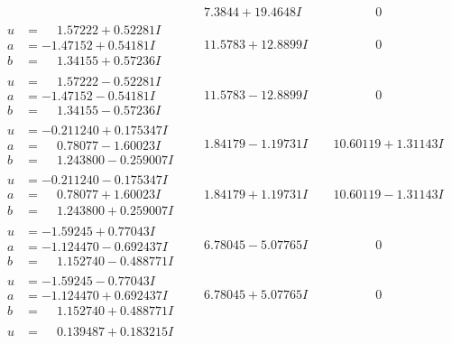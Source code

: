 \documentclass[1p]{elsarticle_modified}
\theoremstyle{definition}
\begin{document}
$$\begin{array}{c|c|c}
 & \phantom{-}7.3844 + 19.4648 I & \phantom{-0.000000 } 0 \\ \hline\begin{aligned}
u &= \phantom{-}1.57222 + 0.52281 I \\
a &= -1.47152 + 0.54181 I \\
b &= \phantom{-}1.34155 + 0.57236 I\end{aligned}
 & \phantom{-}11.5783 + 12.8899 I & \phantom{-0.000000 } 0 \\ \hline\begin{aligned}
u &= \phantom{-}1.57222 - 0.52281 I \\
a &= -1.47152 - 0.54181 I \\
b &= \phantom{-}1.34155 - 0.57236 I\end{aligned}
 & \phantom{-}11.5783 - 12.8899 I & \phantom{-0.000000 } 0 \\ \hline\begin{aligned}
u &= -0.211240 + 0.175347 I \\
a &= \phantom{-}0.78077 - 1.60023 I \\
b &= \phantom{-}1.243800 - 0.259007 I\end{aligned}
 & \phantom{-}1.84179 - 1.19731 I & \phantom{-}10.60119 + 1.31143 I \\ \hline\begin{aligned}
u &= -0.211240 - 0.175347 I \\
a &= \phantom{-}0.78077 + 1.60023 I \\
b &= \phantom{-}1.243800 + 0.259007 I\end{aligned}
 & \phantom{-}1.84179 + 1.19731 I & \phantom{-}10.60119 - 1.31143 I \\ \hline\begin{aligned}
u &= -1.59245 + 0.77043 I \\
a &= -1.124470 - 0.692437 I \\
b &= \phantom{-}1.152740 - 0.488771 I\end{aligned}
 & \phantom{-}6.78045 - 5.07765 I & \phantom{-0.000000 } 0 \\ \hline\begin{aligned}
u &= -1.59245 - 0.77043 I \\
a &= -1.124470 + 0.692437 I \\
b &= \phantom{-}1.152740 + 0.488771 I\end{aligned}
 & \phantom{-}6.78045 + 5.07765 I & \phantom{-0.000000 } 0 \\ \hline\begin{aligned}
u &= \phantom{-}0.139487 + 0.183215 I \\

\end{aligned}
\end{array}$$
\end{document}

